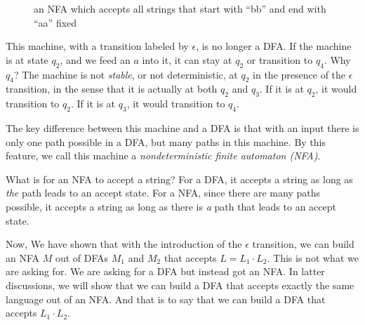 \documentclass[11pt]{article}
\begin{document}
\begin{figure}[ht]
    \centering
    \caption{an NFA which accepts all strings that start with ``bb'' and end with ``aa'' fixed}
    \label{fig:fig7}
\end{figure}

This machine, with a transition labeled by $\epsilon$, is no longer
a DFA. If the machine is at state $q_2$, and we feed an $a$ into it,
it can stay at $q_2$ or transition to $q_4$. Why $q_4$? The machine
is not \emph{stable}, or not deterministic, at $q_2$ in the presence
of the $\epsilon$ transition, in the sense that it is actually at
both $q_2$ and $q_3$. If it is at $q_2$, it would transition to
$q_2$. If it is at $q_3$, it would transition to $q_4$.

The key difference between this machine and a DFA is that with an
input there is only one path possible in a DFA, but many paths in
this machine. By this feature, we call this machine a
\emph{nondeterministic finite automaton (NFA)}.

What is for an NFA to accept a string? For a DFA, it accepts a string
as long as \emph{the} path leads to an accept state. For a NFA, since
there are many paths possible, it accepts a string as long as there is
\emph{a} path that leads to an accept state.

Now, We have shown that with the introduction of the $\epsilon$
transition, we can build an NFA $M$ out of DFAs $M_1$ and $M_2$
that accepts $L = L_1 \cdot L_2$. This is not what we are asking
for. We are asking for a DFA but instead got an NFA. In latter
discussions, we will show that we can build a DFA that accepts
exactly the same language out of an NFA. And that is to say
that we can build a DFA that accepts $L_1 \cdot L_2$.
\end{document}
